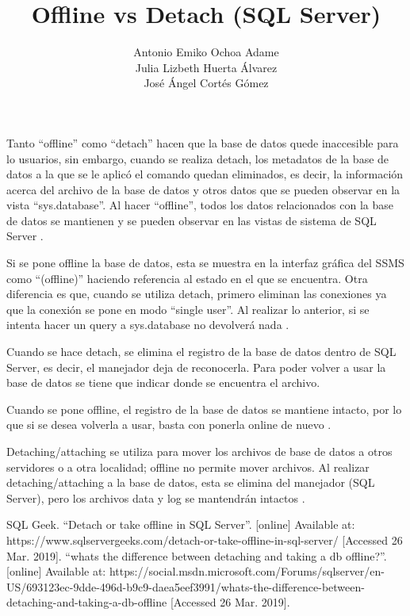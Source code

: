\documentclass{article}
\begin{document}
\title{Offline vs Detach (SQL Server)}
\author{Antonio Emiko Ochoa Adame\\
Julia Lizbeth Huerta Álvarez\\
José Ángel Cortés Gómez}
\maketitle

Tanto ``offline'' como ``detach'' hacen que la base de datos quede inaccesible
para lo usuarios, sin embargo, cuando se realiza detach, los metadatos de la
base de datos a la que se le aplicó el comando quedan eliminados, es decir, la
información acerca del archivo de la base de datos y otros datos que se
pueden observar en la vista ``sys.database''. Al hacer ``offline'', todos los datos
relacionados con la base de datos se mantienen y se pueden observar en las vistas
de sistema de SQL Server \cite{sqlservergeeks}.

\vspace{1em}

Si se pone offline la base de datos, esta se muestra en la interfaz gráfica del
SSMS como ``(offline)'' haciendo referencia al estado en el que se encuentra.
Otra diferencia es que, cuando se utiliza detach, primero eliminan las conexiones
ya que la conexión se pone en modo ``single user''. Al realizar lo anterior, si
se intenta hacer un query a sys.database no devolverá nada \cite{sqlservergeeks}.

\vspace{1em}

Cuando se hace detach, se elimina el registro de la base de datos dentro de SQL
Server, es decir, el manejador deja de reconocerla. Para poder volver a usar la
base de datos se tiene que indicar donde se encuentra el archivo.

Cuando se pone offline, el registro de la base de datos se mantiene intacto,
por lo que si se desea volverla a usar, basta con ponerla online de nuevo \cite{microsoft}.

\vspace{1em}

Detaching/attaching se utiliza para mover los archivos de base de datos a otros
servidores o a otra localidad; offline no permite mover archivos. Al realizar
detaching/attaching a la base de datos, esta se elimina del manejador (SQL Server), pero
los archivos data y log se mantendrán intactos \cite{microsoft}.

\begin{thebibliography}{}
	SQL Geek. ``Detach or take offline in SQL Server''.
	[online] Available at: https://www.sqlservergeeks.com/detach-or-take-offline-in-sql-server/
	[Accessed 26 Mar. 2019].
	``whats the difference between detaching and taking a db offline?''.
	[online] Available at: https://social.msdn.microsoft.com/Forums/sqlserver/en-US/693123ec-9dde-496d-b9c9-daea5eef3991/whats-the-difference-between-detaching-and-taking-a-db-offline
	[Accessed 26 Mar. 2019].
\end{thebibliography}
\end{document}
